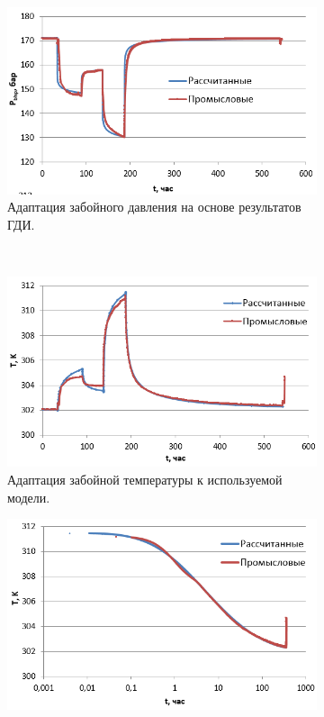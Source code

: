 \begin{figure}[H]
	\begin{subfigure}[b]{0.5\textwidth}
	\centering
	\includegraphics[width=1\textwidth]{pic/adapt_pres.png}
	\caption{Адаптация забойного давления на основе результатов ГДИ.}
	\label{pic:adapt_pres}
	\end{subfigure}
~
	\begin{subfigure}[b]{0.5\textwidth}
		\centering
		\includegraphics[width=1\textwidth]{pic/adapt_temp.png}
		\caption{Адаптация забойной температуры к используемой модели.}
		\label{pic:adapt_temp}
	\end{subfigure}
	\begin{subfigure}[b]{0.5\textwidth}
		\centering
		\includegraphics[width=1\textwidth]{pic/adapt_temp1.png}

\end{subfigure}
\end{figure}
